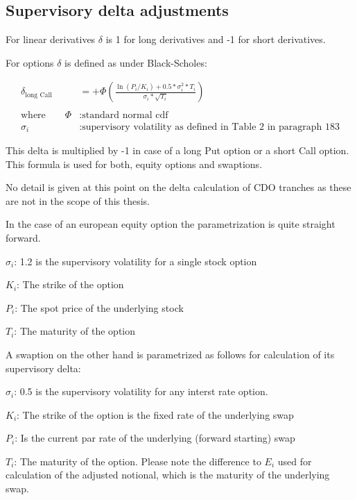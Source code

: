     \hypertarget{supervisory-delta-adjustments}{%
\subsection{Supervisory delta
adjustments}\label{supervisory-delta-adjustments}}

For linear derivatives \(\delta\) is 1 for long derivatives and -1 for
short derivatives.

For options \(\delta\) is defined as under Black-Scholes:

\begin{align*}
\delta_{\text{long Call}} &= +\Phi\left(\frac{\ln\left(P_i / K_i \right) + 0.5 * \sigma_i^2 * T_i}{\sigma_i * \sqrt{T_i}}\right) \\
\\
\text{where} \qquad \Phi &: \text{standard normal cdf} \\
\sigma_i &: \text{supervisory volatility as defined in Table 2 in paragraph 183}
\end{align*}

This delta is multiplied by -1 in case of a long Put option or a short
Call option. This formula is used for both, equity options and
swaptions.

No detail is given at this point on the delta calculation of CDO
tranches as these are not in the scope of this thesis.

    In the case of an european equity option the parametrization is quite
straight forward.

\(\sigma_i\): 1.2 is the supervisory volatility for a single stock
option

\(K_i\): The strike of the option

\(P_i\): The spot price of the underlying stock

\(T_i\): The maturity of the option

A swaption on the other hand is parametrized as follows for calculation
of its supervisory delta:

\(\sigma_i\): 0.5 is the supervisory volatility for any interst rate
option.

\(K_i\): The strike of the option is the fixed rate of the underlying
swap

\(P_i\): Is the current par rate of the underlying (forward starting)
swap

\(T_i\): The maturity of the option. Please note the difference to
\(E_i\) used for calculation of the adjusted notional, which is the
maturity of the underlying swap.


